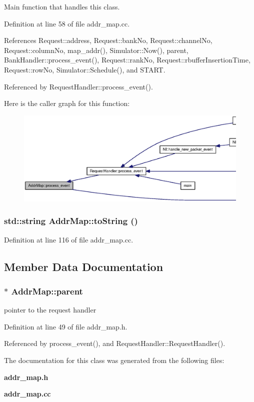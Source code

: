 Main function that handles this class. 



Definition at line 58 of file addr\_\-map.cc.

References Request::address, Request::bankNo, Request::channelNo, Request::columnNo, map\_\-addr(), Simulator::Now(), parent, BankHandler::process\_\-event(), Request::rankNo, Request::rbufferInsertionTime, Request::rowNo, Simulator::Schedule(), and START.

Referenced by RequestHandler::process\_\-event().

Here is the caller graph for this function:\nopagebreak
\begin{figure}[H]
\begin{center}
\leavevmode
\includegraphics[width=420pt]{classAddrMap_e3ac527bcffced20f090db49c4047b60_icgraph}
\end{center}
\end{figure}
\subsubsection[{toString}]{\setlength{\rightskip}{0pt plus 5cm}std::string AddrMap::toString ()}\label{classAddrMap_4b0ee7e9842a671ec6ba76276f2f1feb}




Definition at line 116 of file addr\_\-map.cc.

\subsection{Member Data Documentation}
\subsubsection[{parent}]{$\ast$ {\bf AddrMap::parent}}\label{classAddrMap_b0dc1ee5e15ff1f5e2cee9c3286b4f60}


pointer to the request handler 



Definition at line 49 of file addr\_\-map.h.

Referenced by process\_\-event(), and RequestHandler::RequestHandler().

The documentation for this class was generated from the following files:\begin{CompactItemize}
\item 
{\bf addr\_\-map.h}\item 
{\bf addr\_\-map.cc}\end{CompactItemize}
